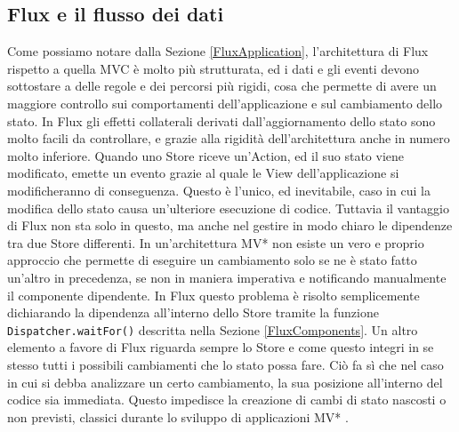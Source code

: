 \subsection{Flux e il flusso dei dati}
Come possiamo notare dalla Sezione \ref{FluxApplication}, l'architettura di Flux rispetto a quella MVC è molto più strutturata, ed i dati e gli eventi devono sottostare a delle regole e dei percorsi più rigidi, cosa che permette di avere un maggiore controllo sui comportamenti dell'applicazione e sul cambiamento dello stato. In Flux gli effetti collaterali derivati dall'aggiornamento dello stato sono molto facili da controllare, e grazie alla rigidità dell'architettura anche in numero molto inferiore. Quando uno Store riceve un'Action, ed il suo stato viene modificato, emette un evento grazie al quale le View dell'applicazione si modificheranno di conseguenza. Questo è l'unico, ed inevitabile, caso in cui la modifica dello stato causa un'ulteriore esecuzione di codice. 
Tuttavia il vantaggio di Flux non sta solo in questo, ma anche nel gestire in modo chiaro le dipendenze tra due Store differenti. In un'architettura MV* non esiste un vero e proprio approccio che permette di eseguire un cambiamento solo se ne è stato fatto un'altro in precedenza, se non in maniera imperativa e notificando manualmente il componente dipendente. In Flux questo problema è risolto semplicemente dichiarando la dipendenza all'interno dello Store tramite la funzione \texttt{Dispatcher.waitFor()} descritta nella Sezione \ref{FluxComponents}.
Un altro elemento a favore di Flux riguarda sempre lo Store e come questo integri in se stesso tutti i possibili cambiamenti che lo stato possa fare. Ciò fa sì che nel caso in cui si debba analizzare un certo cambiamento, la sua posizione all'interno del codice sia immediata. Questo impedisce la creazione di cambi di stato nascosti o non previsti, classici durante lo sviluppo di applicazioni MV* \cite{boduch2016flux}.

